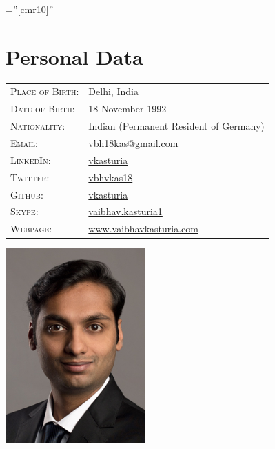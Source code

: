 \documentclass[a4paper,10pt]{article} %
\begin{document}
\pagestyle{empty} %
\font\fb=''[cmr10]'' %


\par{\bigskip\par} %

\section{Personal Data}

\begin{minipage}[b][4.0cm][t]{0.5\textwidth}
\begin{tabular}{ll}
\textsc{Place of Birth:} & Delhi, India \\ 
\textsc{Date of Birth:} & 18 November 1992 \\
\textsc{Nationality:} & Indian (Permanent Resident of Germany)\\
\textsc{Email:} & \href{mailto:vbh18kas@gmail.com}{vbh18kas@gmail.com} \\
\textsc{LinkedIn:} & \href{https://www.linkedin.com/in/vkasturia/}{vkasturia} \\
\textsc{Twitter:} & \href{https://twitter.com/vbhvkas18}{vbhvkas18} \\
\textsc{Github:} & \href{https://github.com/vkasturia}{vkasturia} \\
\textsc{Skype:} & \href{}{vaibhav.kasturia1} \\
\textsc{Webpage:} & \href{https://www.vaibhavkasturia.com}{www.vaibhavkasturia.com}
\end{tabular}
\end{minipage}
\begin{minipage}[b][4.0cm][t]{0.4\textwidth}
\hspace{3.5cm}
\includegraphics[width=0.4\textwidth]{bewerbungsbild_cropped.jpg}
\end{minipage}
\end{document}

